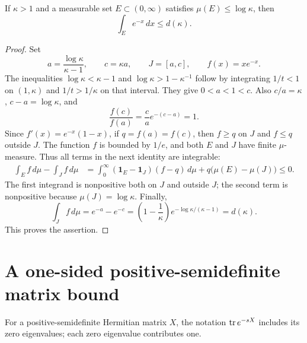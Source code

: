 \documentclass[11pt]{article}
\begin{document}
\begin{hrklemma}\label{hrk:lem:scalar}
If $\kappa>1$ and a measurable set $E\subset(0,\infty)$ satisfies
$\mu(E)\leq\log\kappa$, then
\begin{equation}\label{hrk:eq:integral-bound}
 \int_E e^{-x}\,dx\leq d(\kappa).
\end{equation}
\end{hrklemma}
\begin{proof}
Set
\[
 a=\frac{\log\kappa}{\kappa-1},\qquad
 c=\kappa a,\qquad J=[a,c],\qquad f(x)=xe^{-x}.
\]
The inequalities
$\log\kappa<\kappa-1$ and
$\log\kappa>1-\kappa^{-1}$ follow by integrating $1/t<1$
on $(1,\kappa)$ and $1/t>1/\kappa$ on that interval.
They give $0<a<1<c$. Also $c/a=\kappa$,
$c-a=\log\kappa$, and
\[
 \frac{f(c)}{f(a)}=\frac ca e^{-(c-a)}=1.
\]
Since $f'(x)=e^{-x}(1-x)$, if $q=f(a)=f(c)$, then
$f\geq q$ on $J$ and $f\leq q$ outside $J$.
The function $f$ is bounded by $1/e$, and both $E$ and $J$ have
finite $\mu$-measure. Thus all terms in the next identity are integrable:
\begin{align*}
 \int_E f\,d\mu-\int_J f\,d\mu
 &=\int_0^\infty(\mathbf1_E-\mathbf1_J)(f-q)\,d\mu
       +q\bigl(\mu(E)-\mu(J)\bigr)\leq0.
\end{align*}
The first integrand is nonpositive both on $J$ and outside $J$;
the second term is nonpositive because $\mu(J)=\log\kappa$.
Finally,
\[
 \int_J f\,d\mu=e^{-a}-e^{-c}
  =\left(1-\frac1\kappa\right)e^{-\log\kappa/(\kappa-1)}
  =d(\kappa).
\]
This proves the assertion.
\end{proof}

\section{A one-sided positive-semidefinite matrix bound}
For a positive-semidefinite Hermitian matrix $X$, the notation
$\operatorname{tr} e^{-sX}$ includes its zero eigenvalues; each zero eigenvalue
contributes one.
\end{document}

